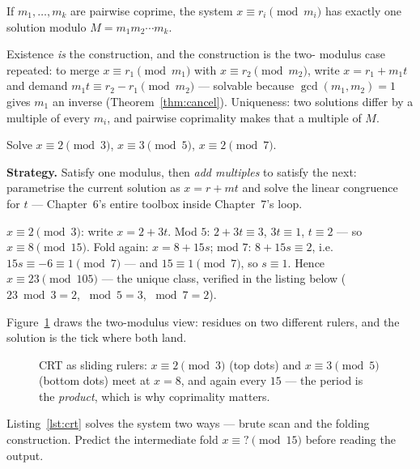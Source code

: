 \begin{theorem}[CRT]\label{thm:crt}
If $m_1, \dots, m_k$ are pairwise coprime, the system $x \equiv r_i
\pmod{m_i}$ has exactly one solution modulo $M = m_1 m_2 \cdots m_k$.
\end{theorem}

Existence \emph{is} the construction, and the construction is the two-
modulus case repeated: to merge $x \equiv r_1 \pmod{m_1}$ with
$x \equiv r_2 \pmod{m_2}$, write $x = r_1 + m_1 t$ and demand
$m_1 t \equiv r_2 - r_1 \pmod{m_2}$ --- solvable because
$\gcd(m_1, m_2) = 1$ gives $m_1$ an inverse (Theorem~\ref{thm:cancel}).
Uniqueness: two solutions differ by a multiple of every $m_i$, and
pairwise coprimality makes that a multiple of $M$.

\begin{example}\label{ex:crt}
Solve $x \equiv 2 \pmod 3$, $x \equiv 3 \pmod 5$, $x \equiv 2 \pmod 7$.
\par\smallskip
\textbf{Strategy.} Satisfy one modulus, then \emph{add multiples} to
satisfy the next: parametrise the current solution as $x = r + mt$ and
solve the linear congruence for $t$ --- Chapter~6's entire toolbox inside
Chapter~7's loop.
\par\smallskip
\begin{solution}
$x \equiv 2 \pmod 3$: write $x = 2 + 3t$. Mod $5$: $2 + 3t \equiv 3$,
$3t \equiv 1$, $t \equiv 2$ --- so $x \equiv 8 \pmod{15}$. Fold again:
$x = 8 + 15s$; mod $7$: $8 + 15s \equiv 2$, i.e.\ $15s \equiv -6 \equiv 1 \pmod 7$ ---
and $15 \equiv 1 \pmod 7$, so $s \equiv 1$.
Hence $x \equiv 23 \pmod{105}$ --- the unique class, verified in the
listing below ($23 \bmod 3 = 2$, $\bmod 5 = 3$, $\bmod 7 = 2$).
\end{solution}
\end{example}

Figure~\ref{fig:rulers} draws the two-modulus view: residues on two
different rulers, and the solution is the tick where both land.

\begin{figure}[ht]\centering

\caption{CRT as sliding rulers: $x \equiv 2 \pmod 3$ (top dots) and
$x \equiv 3 \pmod 5$ (bottom dots) meet at $x = 8$, and again every $15$
--- the period is the \emph{product}, which is why coprimality matters.}
\label{fig:rulers}
\end{figure}

\begin{checkpoint}
Listing~\ref{lst:crt} solves the system two ways --- brute scan and the
folding construction. Predict the intermediate fold $x \equiv ? \pmod{15}$
before reading the output.
\end{checkpoint}

